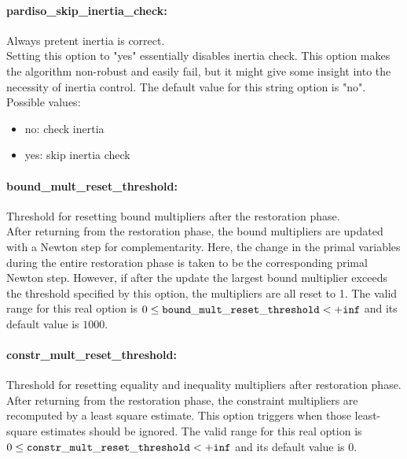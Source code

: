 \paragraph{pardiso\_skip\_inertia\_check:}\label{sec:pardiso_skip_inertia_check} Always pretent inertia is correct. $\;$ \\
 Setting this option to "yes" essentially disables
inertia check. This option makes the algorithm
non-robust and easily fail, but it might give
some insight into the necessity of inertia
control.
The default value for this string option is "no".
\\ 
Possible values:
\begin{itemize}
   \item no: check inertia
   \item yes: skip inertia check
\end{itemize}

\paragraph{bound\_mult\_reset\_threshold:}\label{sec:bound_mult_reset_threshold} Threshold for resetting bound multipliers after the restoration phase. $\;$ \\
 After returning from the restoration phase, the
bound multipliers are updated with a Newton step
for complementarity.  Here, the change in the
primal variables during the entire restoration
phase is taken to be the corresponding primal
Newton step. However, if after the update the
largest bound multiplier exceeds the threshold
specified by this option, the multipliers are all
reset to 1. The valid range for this real option is 
$0 \le {\tt bound\_mult\_reset\_threshold } <  {\tt +inf}$
and its default value is $1000$.


\paragraph{constr\_mult\_reset\_threshold:}\label{sec:constr_mult_reset_threshold} Threshold for resetting equality and inequality multipliers after restoration phase. $\;$ \\
 After returning from the restoration phase, the
constraint multipliers are recomputed by a least
square estimate.  This option triggers when those
least-square estimates should be ignored. The valid range for this real option is 
$0 \le {\tt constr\_mult\_reset\_threshold } <  {\tt +inf}$
and its default value is $0$.


